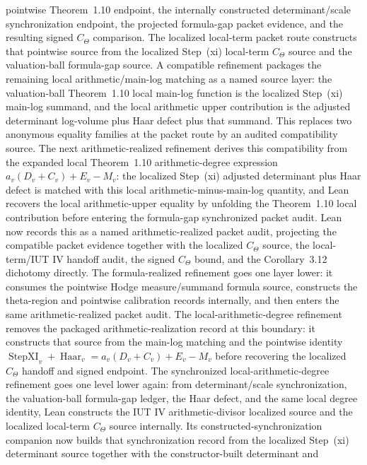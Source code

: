 \documentclass[11pt]{article}
\theoremstyle{plain}
\theoremstyle{definition}
\theoremstyle{remark}
\begin{document}
pointwise Theorem~1.10 endpoint, the internally constructed determinant/scale
synchronization endpoint, the projected formula-gap packet evidence, and the
resulting signed \(C_\Theta\) comparison.
The localized local-term packet route constructs that pointwise source from
the localized Step~(xi) local-term \(C_\Theta\) source and the valuation-ball
formula-gap source.  A compatible refinement packages the remaining
local arithmetic/main-log matching as a named source layer: the valuation-ball
Theorem~1.10 local main-log function is the localized Step~(xi) main-log
summand, and the local arithmetic upper contribution is the adjusted
determinant log-volume plus Haar defect plus that summand.  This replaces two
anonymous equality families at the packet route by an audited compatibility
source.  The next arithmetic-realized refinement derives this compatibility
from the expanded local Theorem~1.10 arithmetic-degree expression
\(a_v(D_v+C_v)+E_v-M_v\): the localized Step~(xi) adjusted determinant plus
Haar defect is matched with this local arithmetic-minus-main-log quantity, and
Lean recovers the local arithmetic-upper equality by unfolding the Theorem~1.10
local contribution before entering the formula-gap synchronized packet audit.
Lean now records this as a named arithmetic-realized packet audit, projecting
the compatible packet evidence together with the localized \(C_\Theta\)
source, the local-term/IUT IV handoff audit, the signed \(C_\Theta\) bound,
and the Corollary~3.12 dichotomy directly.  The
formula-realized refinement goes one layer lower: it consumes the pointwise
Hodge measure/summand formula source, constructs the theta-region and
pointwise calibration records internally, and then enters the same
arithmetic-realized packet audit.  The local-arithmetic-degree refinement
removes the packaged arithmetic-realization record at this boundary: it
constructs that source from the main-log matching and the pointwise identity
\(\operatorname{StepXI}_v+\operatorname{Haar}_v=a_v(D_v+C_v)+E_v-M_v\)
before recovering the localized \(C_\Theta\) handoff and signed endpoint.  The
synchronized local-arithmetic-degree refinement goes one level lower again:
from determinant/scale synchronization, the valuation-ball formula-gap ledger,
the Haar defect, and the same local degree identity, Lean constructs the IUT
IV arithmetic-divisor localized source and the localized local-term
\(C_\Theta\) source internally.  Its constructed-synchronization companion
now builds that synchronization record from the localized Step~(xi)
determinant source together with the constructor-built determinant and
\end{document}
